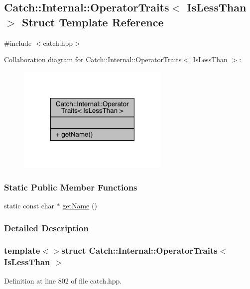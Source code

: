 \hypertarget{a00060}{}\subsection{Catch\+:\+:Internal\+:\+:Operator\+Traits$<$ Is\+Less\+Than $>$ Struct Template Reference}
\label{a00060}


{\ttfamily \#include $<$catch.\+hpp$>$}



Collaboration diagram for Catch\+:\+:Internal\+:\+:Operator\+Traits$<$ Is\+Less\+Than $>$\+:\nopagebreak
\begin{figure}[H]
\begin{center}
\leavevmode
\includegraphics[width=206pt]{a00330}
\end{center}
\end{figure}
\subsubsection*{Static Public Member Functions}
\begin{DoxyCompactItemize}
\item 
static const char $\ast$ \hyperlink{a00060_aa3b536ddbd2e34b1253931ff00c32712}{get\+Name} ()
\end{DoxyCompactItemize}


\subsubsection{Detailed Description}
\subsubsection*{template$<$$>$struct Catch\+::\+Internal\+::\+Operator\+Traits$<$ Is\+Less\+Than $>$}



Definition at line 802 of file catch.\+hpp.




